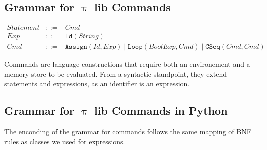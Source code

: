 \documentclass[a4paper,openany]{book}
\begin{document}
\subsection{Grammar for $\uppi$ lib
Commands}\label{grammar-for-ux3c0-lib-commands}

\(\begin{array}{rcl} Statement & ::= & Cmd \\ Exp & ::= & \mathtt{Id}(String) \\ Cmd & ::= & \mathtt{Assign}(Id, Exp) \mid \mathtt{Loop}(BoolExp, Cmd) \mid \mathtt{CSeq}(Cmd, Cmd) \end{array}\)

Commands are language constructions that require both an environement
and a memory store to be evaluated. From a syntactic standpoint, they
extend statements and expressions, as an identifier is an expression.

    \subsection{Grammar for $\uppi$ lib Commands in
Python}\label{grammar-for-ux3c0-lib-commands-in-python}

The enconding of the grammar for commands follows the same mapping of
BNF rules as classes we used for expressions.
\end{document}
